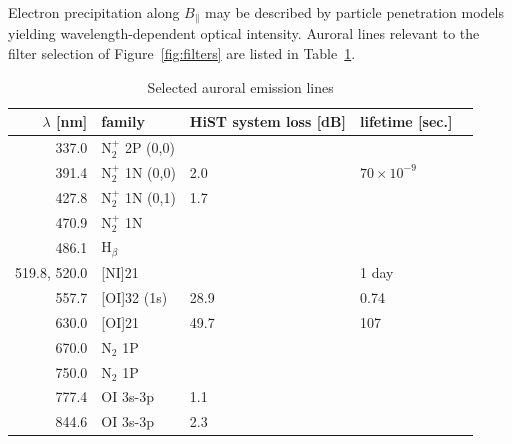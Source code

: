 Electron precipitation along $B_\parallel$ may be described by particle penetration models yielding wavelength-dependent optical intensity.
Auroral lines relevant to the filter selection of Figure~\ref{fig:filters} are listed in Table~\ref{tab:spectrum}.
\begin{table}\centering
    \caption{Selected auroral emission lines}\label{tab:spectrum}
    \begin{tabular}{rllll}
        \toprule
        $\lambda$ [nm] & family  & HiST system loss [dB] & lifetime [sec.] \\
        \midrule
        337.0 & N$_2^+$ 2P (0,0) &      &  \\
        391.4 & N$_2^+$ 1N (0,0) & 2.0  & $70 \times 10^{-9}$ \\ %
        427.8 & N$_2^+$ 1N (0,1) & 1.7  & \\ %
        470.9 & N$_2^+$ 1N & & \\
        486.1 & H$_\beta$ & & \\ %
        519.8, 520.0 & [NI]21 & & 1 day \\ %
        557.7 & [OI]32  (1s) & 28.9 & 0.74 \\ %
        630.0 & [OI]21      & 49.7 & 107 \\  %
        670.0 & N$_2$ 1P & &  \\ %
        750.0 & N$_2$ 1P & &  \\ %
        777.4 & OI   3s-3p  & 1.1 & \\  %
        844.6 & OI   3s-3p  & 2.3 & \\  %
        \bottomrule
    \end{tabular}
\end{table}
